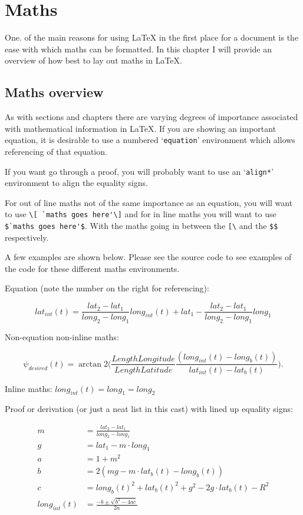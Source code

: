 \chapter{Maths}

One. of the main reasons for using \LaTeX{} in the first place for a document is the ease with which maths can be formatted. In this chapter I will provide an overview of how best to lay out maths in \LaTeX{}.

\section{Maths overview}

As with sections and chapters there are varying degrees of importance associated with mathematical information in \LaTeX{}. If you are showing an important equation, it is desirable to use a numbered `\verb+equation+' environment which allows referencing of that equation.

If you want go through a proof, you will probably want to use an `\verb+align*+' environment to align the equality signs. 

For out of line maths not of the same importance as an equation, you will want to use \verb+\[ `maths goes here'\]+ and for in line maths you will want to use\\ \verb+$`maths goes here'$+. With the maths going in between the \verb+[\+ and the \verb+$$+ respectively. 


A few examples are shown below. Please see the source code to see examples of the code for these different maths environments.

Equation (note the number on the right for referencing):

\begin{equation}
    lat_{int}(t) = \frac{lat_2-lat_1}{long_2-long_1}long_{int}(t)+lat_1-\frac{lat_2-lat_1}{long_2-long_1} long_1
\end{equation}

Non-equation non-inline maths:

\[
\psi_{desired}(t) = \arctan2\bigg(\frac{LengthLongitude}{LengthLatitude}\frac{(long_{int}(t)-long_b(t))}{lat_{int}(t)-lat_b(t)}\bigg).
\]

Inline maths: $long_{int}(t) = long_1 = long_2$

Proof or derivation (or just a neat list in this cast) with lined up equality signs:

\begin{align*}
    m &= \frac{lat_2-lat_1}{long_2-long_1}\\
    g &= lat_1-m\cdot long_1\\
    a &= 1+m^2\\
    b &= 2(mg-m\cdot lat_b(t)-long_b(t))\\
    c &= long_b(t)^2+lat_b(t)^2+g^2-2g\cdot lat_b(t)-R^2\\
    long_{int}(t) &= \frac{-b\pm\sqrt{b^2-4ac}}{2a}
\end{align*}

